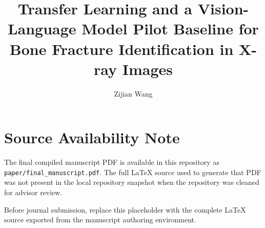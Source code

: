 \documentclass[11pt]{article}
\title{Transfer Learning and a Vision-Language Model Pilot Baseline for Bone Fracture Identification in X-ray Images}
\author{Zijian Wang}
\date{}
\begin{document}
\maketitle

\section*{Source Availability Note}

The final compiled manuscript PDF is available in this repository as
\texttt{paper/final\_manuscript.pdf}. The full LaTeX source used to generate
that PDF was not present in the local repository snapshot when the repository
was cleaned for advisor review.

Before journal submission, replace this placeholder with the complete LaTeX
source exported from the manuscript authoring environment.
\end{document}
